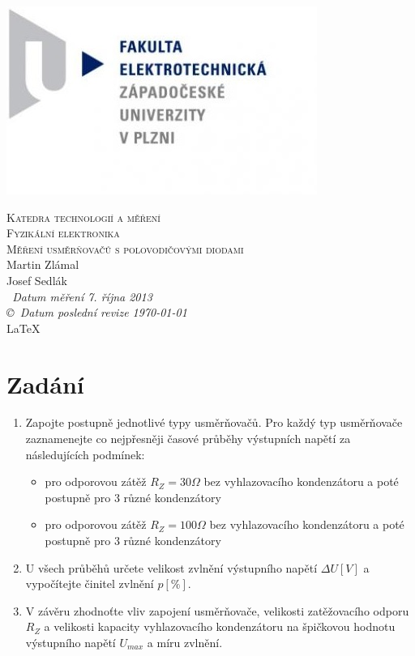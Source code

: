 \documentclass[12pt]{article} %
\newcommand{\bigsize}{\fontsize{35pt}{20pt}\selectfont}
\begin{document}
\begin{titlepage}
	\includegraphics[scale=0.7]{logo.jpg}
	\vspace*{\fill}
	\begin{center}
		\textsc{\LARGE Katedra technologií a měření}\\[0.3cm]
		\textsc{\LARGE \bigsize Fyzikální elektronika}\\[0.3cm]
		\textsc{\LARGE Měření usměrňovačů s polovodičovými diodami}\\[1cm]
		Martin Zlámal \\
		Josef Sedlák \\[1cm]
		{\small\em \ Datum měření 7. října 2013 } \\
		{\small\em \copyright \ Datum poslední revize \today } \\
		\LaTeX
	\end{center}
	\vspace*{\fill}
\end{titlepage}
\tableofcontents
\listoffigures
\listoftables
\newpage

\section{Zadání}
\begin{enumerate}
\item Zapojte postupně jednotlivé typy usměrňovačů. Pro každý typ usměrňovače
zaznamenejte co nejpřesněji časové průběhy výstupních napětí za následujících
podmínek:
	\begin{itemize}
		\item pro odporovou zátěž $R_Z = 30 \Omega$ bez vyhlazovacího kondenzátoru a poté
postupně pro 3 různé kondenzátory
		\item pro odporovou zátěž $R_Z = 100 \Omega$ bez vyhlazovacího kondenzátoru a poté
postupně pro 3 různé kondenzátory
	\end{itemize}
\item U všech průběhů určete velikost zvlnění výstupního napětí $\Delta U [V]$ a vypočítejte činitel zvlnění $p [\%]$.
\item V závěru zhodnoťte vliv zapojení usměrňovače, velikosti zatěžovacího odporu $R_Z$ a
velikosti kapacity vyhlazovacího kondenzátoru na špičkovou hodnotu výstupního
napětí $U_{max}$ a míru zvlnění.
\end{enumerate}
\end{document}
